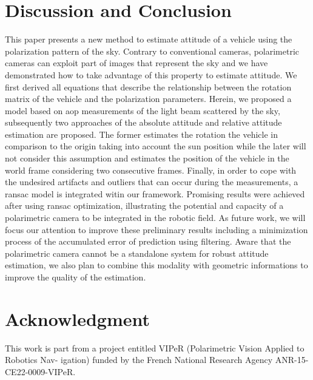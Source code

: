 \section{Discussion and Conclusion}
\label{sec:dis-con}

This paper presents a new method to estimate attitude of a vehicle using the
polarization pattern of the sky.  Contrary to conventional cameras,
polarimetric cameras can exploit part of images that represent the sky and we
have demonstrated how to take advantage of this property to estimate
attitude. We first derived all equations that describe the relationship between
the rotation matrix of the vehicle and the polarization parameters.
Herein, we proposed a model based on \gls{aop} measurements of the light beam
scattered by the sky, subsequently two approaches of the absolute attitude and
relative attitude estimation are proposed.  The former estimates the rotation
the vehicle in comparison to the origin taking into account the sun position
while the later will not consider this assumption and estimates the position of
the vehicle in the world frame considering two consecutive frames.
Finally, in order to cope with the undesired artifacts and outliers that can
occur during the measurements, a ransac model is integrated witin our
framework.  Promising results were achieved after using ransac optimization,
illustrating the potential and capacity of a polarimetric camera to be
integrated in the robotic field.  As future work, we will focus our attention
to improve these preliminary results including a minimization process of the
accumulated error of prediction using filtering. Aware that the polarimetric
camera cannot be a standalone system for robust attitude estimation, we also
plan to combine this modality with geometric informations to improve the quality
of the estimation.


\section{Acknowledgment}
\label{sec:ack}
This work is part from a project entitled VIPeR (Polarimetric Vision Applied to Robotics Nav-
igation) funded by the French National Research Agency ANR-15-CE22-0009-VIPeR.


